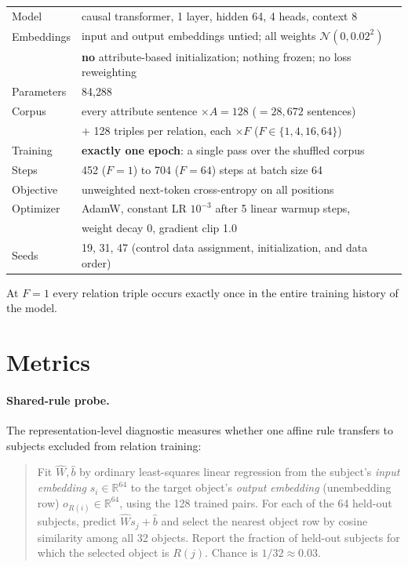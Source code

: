 \documentclass[11pt]{article}
\providecommand{\enote}[2]{}
\begin{document}
\begin{center}
\begin{tabular}{ll}
\toprule
Model & causal transformer, 1 layer, hidden 64, 4 heads, context 8\\
Embeddings & input and output embeddings untied; all weights $\mathcal{N}(0, 0.02^2)$\\
 & \textbf{no} attribute-based initialization; nothing frozen; no loss reweighting\\
Parameters & 84{,}288\\
Corpus & every attribute sentence $\times A{=}128$ ($= 28{,}672$ sentences)\\
 & $+$ 128 triples per relation, each $\times F$ ($F \in \{1,4,16,64\}$)\\
Training & \textbf{exactly one epoch}: a single pass over the shuffled corpus\\
Steps & 452 ($F{=}1$) to 704 ($F{=}64$) steps at batch size 64\\
Objective & unweighted next-token cross-entropy on all positions\\
Optimizer & AdamW, constant LR $10^{-3}$ after 5 linear warmup steps,\\
 & weight decay 0, gradient clip 1.0\\
Seeds & 19, 31, 47 (control data assignment, initialization, and data order)\\
\bottomrule
\end{tabular}
\end{center}

At $F{=}1$ every relation triple occurs exactly once in the entire training history of the model.

\enote{hs}{i didn't understand what steps are}

\section{Metrics}

\paragraph{Shared-rule probe.}
The representation-level diagnostic measures whether one affine rule transfers to
subjects excluded from relation training:

\begin{quote}
Fit $\hat W, \hat b$ by ordinary least-squares linear regression from the subject's \emph{input embedding} $s_i \in \mathbb{R}^{64}$ to the target object's \emph{output embedding} (unembedding row) $o_{R(i)} \in \mathbb{R}^{64}$, using the 128 trained pairs. For each of the 64 held-out subjects, predict $\hat W s_j + \hat b$ and select the nearest object row by cosine similarity among all 32 objects. Report the fraction of held-out subjects for which the selected object is $R(j)$. Chance is $1/32 \approx 0.03$.
\end{quote}
\end{document}
